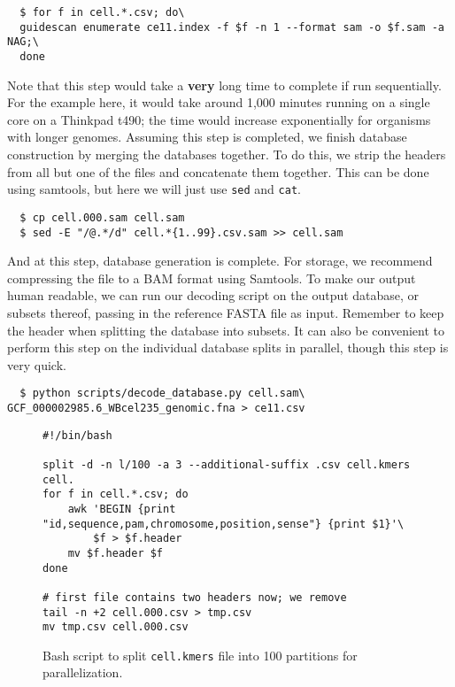 \documentclass[11pt]{article}
\begin{document}
\begin{verbatim}
  $ for f in cell.*.csv; do\
  guidescan enumerate ce11.index -f $f -n 1 --format sam -o $f.sam -a NAG;\
  done
\end{verbatim}

Note that this step would take a \textbf{very} long time to complete
if run sequentially. For the example here, it would take around 1,000
minutes running on a single core on a Thinkpad t490; the time would
increase exponentially for organisms with longer genomes. Assuming
this step is completed, we finish database construction by merging the
databases together. To do this, we strip the headers from all but one
of the files and concatenate them together. This can be done using
samtools, but here we will just use \texttt{sed} and \texttt{cat}.

\begin{verbatim}
  $ cp cell.000.sam cell.sam
  $ sed -E "/@.*/d" cell.*{1..99}.csv.sam >> cell.sam
\end{verbatim}

And at this step, database generation is complete. For storage, we
recommend compressing the file to a BAM format using Samtools. To make
our output human readable, we can run our decoding script on the
output database, or subsets thereof, passing in the reference FASTA
file as input. Remember to keep the header when splitting the database
into subsets. It can also be convenient to perform this step on the
individual database splits in parallel, though this step is very
quick.

\vspace{-0.8em}
\begin{verbatim}
  $ python scripts/decode_database.py cell.sam\ GCF_000002985.6_WBcel235_genomic.fna > ce11.csv
\end{verbatim}

\begin{figure}[ht]
  \centering
\begin{verbatim}
#!/bin/bash

split -d -n l/100 -a 3 --additional-suffix .csv cell.kmers cell.
for f in cell.*.csv; do
    awk 'BEGIN {print "id,sequence,pam,chromosome,position,sense"} {print $1}'\
        $f > $f.header
    mv $f.header $f
done

# first file contains two headers now; we remove
tail -n +2 cell.000.csv > tmp.csv
mv tmp.csv cell.000.csv
\end{verbatim}
\caption{\label{fig:splitkmers} Bash script to split
  \texttt{cell.kmers} file into 100 partitions for parallelization.}
\end{figure}
\end{document}
